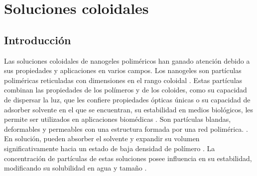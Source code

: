 \chapter{Soluciones coloidales} \label{chapter:mc:soluciones}
	

	
	\section{Introducci\'on}
	
	Las soluciones coloidales de nanogeles polim\'ericos han ganado atenci\'on debido a sus propiedades y aplicaciones en varios campos. Los nanogeles son part\'iculas polim\'ericas reticuladas con dimensiones en el rango coloidal \cite{10.1002/pola.27653}. Estas part\'iculas combinan las propiedades de los pol\'imeros y de los coloides, como su capacidad de dispersar la luz, que les confiere propiedades \'opticas \'unicas o su capacidad de adsorber solvente en el que se encuentran, su estabilidad en medios biol\'ogicos, les permite ser utilizados en aplicaciones biom\'edicas \cite{lyon2012polymer}. Son part\'iculas blandas, deformables y permeables con una estructura formada por una red polim\'erica. \cite{lyon2012polymer}. En soluci\'on, pueden absorber el solvente y expandir su volumen significativamente hacia un estado de baja densidad de pol\'imero \cite{karg2019nanogels, perez2021thermodynamic}. La concentraci\'on de part\'iculas de estas soluciones posee influencia en su estabilidad,  modificando su solubilidad en agua y tama\~no \cite{10.3390/polym13234071}. 
	
